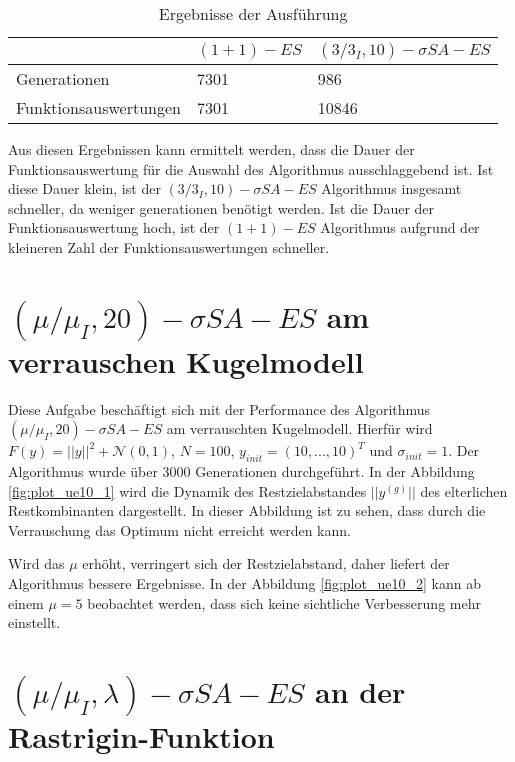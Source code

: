 \begin{table}[h]
  \begin{center}
  \begin{tabular}{|l|p{5cm}|p{5cm}|}
    \hline
     & $(1+1)-ES$ & $(3/3_I,10)-\sigma SA-ES$ \\
    \hline
    Generationen & 7301 & 986 \\
    \hline
    Funktionsauswertungen & 7301 & 10846 \\
    \hline
  \end{tabular}
  \caption{Ergebnisse der Ausführung}
  \end{center}
\end{table}

Aus diesen Ergebnissen kann ermittelt werden, dass die Dauer der Funktionsauswertung für die Auswahl des Algorithmus ausschlaggebend ist. Ist diese Dauer klein, ist der $(3/3_I,10)-\sigma SA-ES$ Algorithmus insgesamt schneller, da weniger generationen benötigt werden. Ist die Dauer der Funktionsauswertung hoch, ist der $(1+1)-ES$ Algorithmus aufgrund der kleineren Zahl der Funktionsauswertungen schneller.

\chapter{$(\mu/\mu_I,20)-\sigma SA-ES$ am verrauschen Kugelmodell}

Diese Aufgabe beschäftigt sich mit der Performance des Algorithmus $(\mu/\mu_I,20)-\sigma SA-ES$ am verrauschten Kugelmodell. Hierfür wird $F(y)=||y||^2+\mathcal{N}(0,1)$, $N=100$, $y_{init}=(10,...,10)^T$ und $\sigma_{init}=1$.
Der Algorithmus wurde über 3000 Generationen durchgeführt. In der Abbildung \ref{fig:plot_ue10_1} wird die Dynamik des Restzielabstandes $||y^{(g)}||$ des elterlichen Restkombinanten dargestellt. In dieser Abbildung ist zu sehen, dass durch die Verrauschung das Optimum nicht erreicht werden kann.    



Wird das $\mu$ erhöht, verringert sich der Restzielabstand, daher liefert der Algorithmus bessere Ergebnisse. In der Abbildung \ref{fig:plot_ue10_2} kann ab einem $\mu = 5$ beobachtet werden, dass sich keine sichtliche Verbesserung mehr einstellt.

\chapter{$(\mu/\mu_I,\lambda)-\sigma SA-ES$ an der Rastrigin-Funktion}

